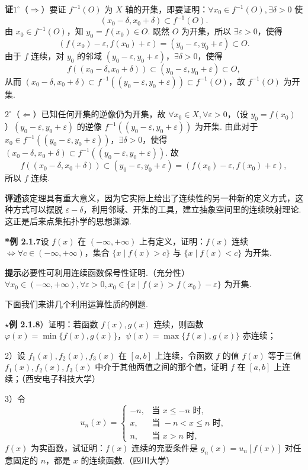 \documentclass[UTF8,12pt,a4paper,fontset=fandol]{ctexart}
\begin{document}
\noindent\textbf{证}\quad $1^\circ$（$\Rightarrow$）要证 $f^{-1}(O)$ 为 $X$ 轴的开集，即要证明：$\forall x_0\in f^{-1}(O),\exists\delta>0$ 使
\[
  (x_0-\delta,x_0+\delta)\subset f^{-1}(O).
\tag{1}
\]
由 $x_0\in f^{-1}(O)$，知 $y_0=f(x_0)\in O$. 既然 $O$ 为开集，所以 $\exists\varepsilon>0$，使得
\[
  (f(x_0)-\varepsilon,f(x_0)+\varepsilon)=(y_0-\varepsilon,y_0+\varepsilon)\subset O.
\tag{2}
\]
由于 $f$ 连续，对 $y_0$ 的邻域 $(y_0-\varepsilon,y_0+\varepsilon)$，$\exists\delta>0$，使得
\[
  f((x_0-\delta,x_0+\delta))\subset (y_0-\varepsilon,y_0+\varepsilon)\subset O,
\]
从而 $(x_0-\delta,x_0+\delta)\subset f^{-1}((y_0-\varepsilon,y_0+\varepsilon))\subset f^{-1}(O)$，故 $f^{-1}(O)$ 为开集.

$2^\circ$（$\Leftarrow$）已知任何开集的逆像仍为开集，故 $\forall x_0\in X,\forall\varepsilon>0$，（设 $y_0=f(x_0)$）$(y_0-\varepsilon,y_0+\varepsilon)$ 的逆像 $f^{-1}((y_0-\varepsilon,y_0+\varepsilon))$ 为开集. 由此对于 $x_0\in f^{-1}((y_0-\varepsilon,y_0+\varepsilon))$，$\exists\delta>0$，使得 $(x_0-\delta,x_0+\delta)\subset f^{-1}((y_0-\varepsilon,y_0+\varepsilon))$. 故
\[
  f((x_0-\delta,x_0+\delta))\subset (y_0-\varepsilon,y_0+\varepsilon)=(f(x_0)-\varepsilon,f(x_0)+\varepsilon),
\]
所以 $f$ 连续.

\noindent\textbf{评述}\quad 该定理具有重大意义，因为它实际上给出了连续性的另一种新的定义方式，这种方式可以摆脱 $\varepsilon-\delta$，利用邻域、开集的工具，建立抽象空间里的连续映射理论. 这正是后来点集拓扑学的思想渊源.

\noindent\textbf{*例 2.1.7}\quad 设 $f(x)$ 在 $(-\infty,+\infty)$ 上有定义，证明：$f(x)$ 连续 $\Leftrightarrow \forall c\in(-\infty,+\infty)$，集合 $\{x\mid f(x)>c\}$ 与 $\{x\mid f(x)<c\}$ 为开集.

\noindent\textbf{提示}\quad 必要性可利用连续函数保号性证明.（充分性）$\forall x_0\in(-\infty,+\infty),\forall\varepsilon>0,x_0\in\{x\mid f(x)>f(x_0)-\varepsilon\}$ 为开集.

下面我们来讲几个利用运算性质的例题.

\noindent\textbf{$\star$例 2.1.8}）证明：若函数 $f(x),g(x)$ 连续，则函数 $\varphi(x)=\min\{f(x),g(x)\}$，$\psi(x)=\max\{f(x),g(x)\}$ 亦连续；

2）设 $f_1(x),f_2(x),f_3(x)$ 在 $[a,b]$ 上连续，令函数 $f$ 的值 $f(x)$ 等于三值 $f_1(x),f_2(x),f_3(x)$ 中介于其他两值之间的那个值，证明 $f$ 在 $[a,b]$ 上连续；（西安电子科技大学）

3）令
\[
  u_n(x)=
  \begin{cases}
    -n, & \text{当 }x\le -n\text{ 时},\\
    x, & \text{当 }-n<x\le n\text{ 时},\\
    n, & \text{当 }x>n\text{ 时},
  \end{cases}
\]
$f(x)$ 为实函数，试证明：$f(x)$ 连续的充要条件是 $g_n(x)=u_n[f(x)]$ 对任意固定的 $n$，都是 $x$ 的连续函数.（四川大学）
\end{document}
